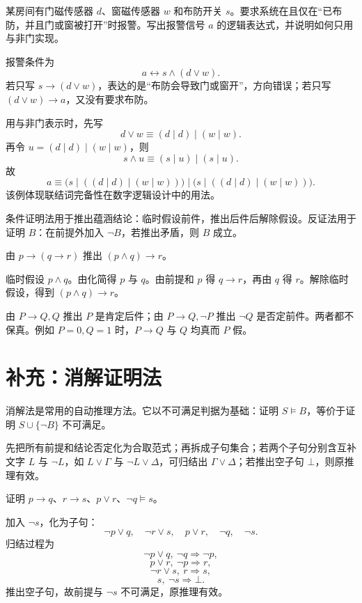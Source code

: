 \begin{example}[title={报警系统逻辑设计}]\label{ch1-alarm}
某房间有门磁传感器 $d$、窗磁传感器 $w$ 和布防开关 $s$。要求系统在且仅在“已布防，并且门或窗被打开”时报警。写出报警信号 $a$ 的逻辑表达式，并说明如何只用与非门实现。
\begin{solution}
报警条件为
\[
a\leftrightarrow s\land(d\lor w).
\]
若只写 $s\to(d\lor w)$，表达的是“布防会导致门或窗开”，方向错误；若只写 $(d\lor w)\to a$，又没有要求布防。

用与非门表示时，先写
\[
d\lor w\equiv(d\mid d)\mid(w\mid w).
\]
再令 $u=(d\mid d)\mid(w\mid w)$，则
\[
s\land u\equiv(s\mid u)\mid(s\mid u).
\]
故
\[
a\equiv
\bigl(s\mid((d\mid d)\mid(w\mid w))\bigr)
\mid
\bigl(s\mid((d\mid d)\mid(w\mid w))\bigr).
\]
该例体现联结词完备性在数字逻辑设计中的用法。
\end{solution}
\end{example}

条件证明法用于推出蕴涵结论：临时假设前件，推出后件后解除假设。反证法用于证明 $B$：在前提外加入 $\neg B$，若推出矛盾，则 $B$ 成立。

\begin{example}[title={条件证明}]\label{ch1-conditional-proof}
由 $p\to(q\to r)$ 推出 $(p\land q)\to r$。
\begin{solution}
临时假设 $p\land q$。由化简得 $p$ 与 $q$。由前提和 $p$ 得 $q\to r$，再由 $q$ 得 $r$。解除临时假设，得到 $(p\land q)\to r$。
\end{solution}
\end{example}

\begin{pitfall}[两种常见错误推理]\label{ch1-fallacies}
由 $P\to Q,Q$ 推出 $P$ 是肯定后件；由 $P\to Q,\neg P$ 推出 $\neg Q$ 是否定前件。两者都不保真。例如 $P=0,Q=1$ 时，$P\to Q$ 与 $Q$ 均真而 $P$ 假。
\end{pitfall}

\section{补充：消解证明法}

消解法是常用的自动推理方法。它以不可满足判据为基础：证明 $S\vDash B$，等价于证明 $S\cup\{\neg B\}$ 不可满足。

\begin{method}[命题消解法]\label{ch1-resolution-method}
先把所有前提和结论否定化为合取范式；再拆成子句集合；若两个子句分别含互补文字 $L$ 与 $\neg L$，如 $L\lor\Gamma$ 与 $\neg L\lor\Delta$，可归结出 $\Gamma\lor\Delta$；若推出空子句 $\bot$，则原推理有效。
\end{method}

\begin{example}[title={消解证明}]\label{ch1-resolution-example}
证明 $p\to q$、$r\to s$、$p\lor r$、$\neg q\vDash s$。
\begin{solution}
加入 $\neg s$，化为子句：
\[
\neg p\lor q,\quad \neg r\lor s,\quad p\lor r,\quad \neg q,\quad \neg s.
\]
归结过程为
\[
\neg p\lor q,\ \neg q\Rightarrow \neg p,
\]
\[
p\lor r,\ \neg p\Rightarrow r,
\]
\[
\neg r\lor s,\ r\Rightarrow s,
\]
\[
s,\ \neg s\Rightarrow\bot.
\]
推出空子句，故前提与 $\neg s$ 不可满足，原推理有效。
\end{solution}
\end{example}
